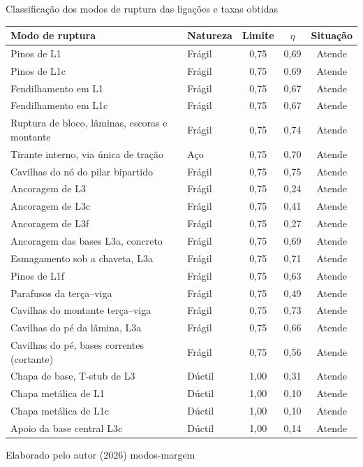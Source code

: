 \tabela
{Classificação dos modos de ruptura das ligações e taxas obtidas}
{\footnotesize
\begin{tabular}{llccc}
\toprule
    \textbf{Modo de ruptura} & \textbf{Natureza} & \textbf{Limite} & \textbf{$\eta$} & \textbf{Situação} \\
\midrule
    Pinos de L1                  & Frágil & 0,75 & 0,69 & Atende \\
    Pinos de L1c                 & Frágil & 0,75 & 0,69 & Atende \\
    Fendilhamento em L1          & Frágil & 0,75 & 0,67 & Atende \\
    Fendilhamento em L1c         & Frágil & 0,75 & 0,67 & Atende \\
    Ruptura de bloco, lâminas, escoras e montante & Frágil & 0,75 & 0,74 & Atende \\
    Tirante interno, via única de tração & Aço & 0,75 & 0,70 & Atende \\
    Cavilhas do nó do pilar bipartido & Frágil & 0,75 & 0,75 & Atende \\
    Ancoragem de L3              & Frágil & 0,75 & 0,24 & Atende \\
    Ancoragem de L3c             & Frágil & 0,75 & 0,41 & Atende \\
    Ancoragem de L3f             & Frágil & 0,75 & 0,27 & Atende \\
    Ancoragem das bases L3a, concreto & Frágil & 0,75 & 0,69 & Atende \\
    Esmagamento sob a chaveta, L3a & Frágil & 0,75 & 0,71 & Atende \\
    Pinos de L1f                 & Frágil & 0,75 & 0,63 & Atende \\
    Parafusos da terça–viga      & Frágil & 0,75 & 0,49 & Atende \\
    Cavilhas do montante terça–viga & Frágil & 0,75 & 0,73 & Atende \\
    Cavilhas do pé da lâmina, L3a & Frágil & 0,75 & 0,66 & Atende \\
    Cavilhas do pé, bases correntes (cortante) & Frágil & 0,75 & 0,56 & Atende \\
    Chapa de base, T-stub de L3  & Dúctil & 1,00 & 0,31 & Atende \\
    Chapa metálica de L1         & Dúctil & 1,00 & 0,10 & Atende \\
    Chapa metálica de L1c        & Dúctil & 1,00 & 0,10 & Atende \\
    Apoio da base central L3c    & Dúctil & 1,00 & 0,14 & Atende \\
\bottomrule
\end{tabular}}
{Elaborado pelo autor (2026)}
{modos-margem}
{}
{}

